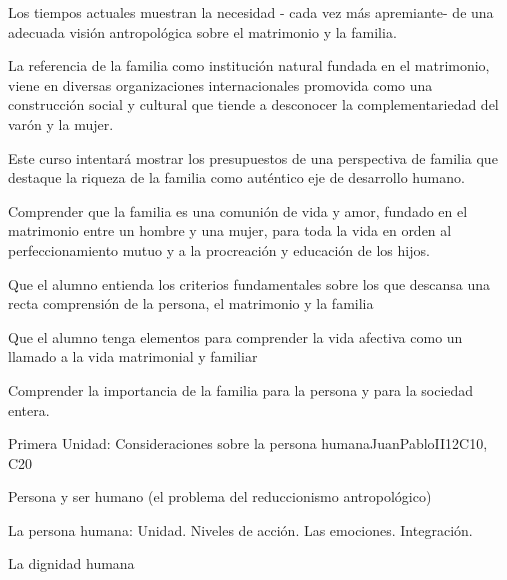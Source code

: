 \begin{syllabus}


\begin{justification}
Los tiempos actuales muestran la necesidad - cada vez más apremiante-  de una adecuada visión antropológica sobre el matrimonio y la familia.

La referencia de la familia como institución natural fundada en el matrimonio, viene en diversas organizaciones internacionales promovida como una construcción social y cultural que tiende a desconocer la complementariedad del varón y la mujer.

Este curso intentará mostrar los presupuestos de una perspectiva de familia que destaque la riqueza de la familia como auténtico eje de desarrollo humano.
\end{justification}

\begin{goals}
	\item Comprender que la familia es una comunión de vida y amor, fundado en el matrimonio entre un hombre y una mujer, para toda la vida en orden al perfeccionamiento mutuo y a la procreación y educación de los hijos.
	\item Que el alumno entienda los criterios fundamentales sobre los que descansa una recta comprensión de la persona, el matrimonio y la familia
	\item Que el alumno tenga elementos para comprender la vida afectiva como un llamado a la vida matrimonial y familiar
	\item Comprender la importancia de la familia para la persona y para la sociedad entera.
\end{goals}

\begin{outcomes}
    \item {}
    \item {}
    \item {}
\end{outcomes}
\begin{competences}
    \item {}
    \item {}
\end{competences}

\begin{unit}{}{Primera Unidad: Consideraciones sobre la persona humana}{JuanPabloII}{12}{C10, C20}
\begin{topics}
	\item Persona y ser humano (el problema del reduccionismo antropológico)
	\item La persona humana: Unidad. Niveles de acción. Las emociones. Integración.
	\item La dignidad humana
\end{topics}


\end{unit}
\end{syllabus}
